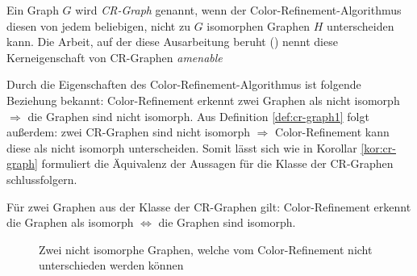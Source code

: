 \begin{Definition}
	Ein Graph $G$ wird \emph{CR-Graph} genannt, wenn der Color-Refinement-Algorithmus diesen von jedem beliebigen, nicht zu $G$ isomorphen Graphen $H$ unterscheiden kann.
	Die Arbeit, auf der diese Ausarbeitung beruht (\cite{Arvind2015}) nennt diese Kerneigenschaft von CR-Graphen \emph{amenable}
	\label{def:cr-graph1}
\end{Definition}

Durch die Eigenschaften des Color-Refinement-Algorithmus ist folgende Beziehung bekannt: Color-Refinement erkennt zwei Graphen als nicht isomorph $\Rightarrow$ die Graphen sind nicht isomorph.
Aus Definition \ref{def:cr-graph1} folgt außerdem: zwei CR-Graphen sind nicht isomorph $\Rightarrow$ Color-Refinement kann diese als nicht isomorph unterscheiden.
Somit lässt sich wie in Korollar \ref{kor:cr-graph} formuliert die Äquivalenz der Aussagen für die Klasse der CR-Graphen schlussfolgern.

\begin{Korollar}
	Für zwei Graphen aus der Klasse der CR-Graphen gilt: Color-Refinement erkennt die Graphen als isomorph $\Leftrightarrow$ die Graphen sind isomorph.
	\label{kor:cr-graph}
\end{Korollar}

\begin{figure}[t]
	\centering
	\caption{Zwei nicht isomorphe Graphen, welche vom Color-Refinement nicht unterschieden werden können}
	\label{fig:nicht_isomorphe_graphen}
\end{figure}

